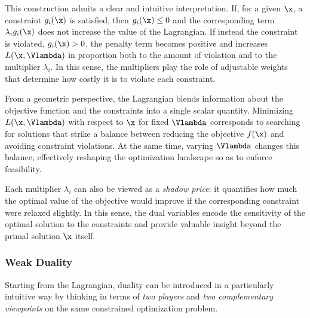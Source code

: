 This construction admits a clear and intuitive interpretation. If, for a given $\x$, a constraint $g_i(\x)$ is satisfied, then $g_i(\x) \le 0$ and the corresponding term $\lambda_i g_i(\x)$ does not increase the value of the Lagrangian. If instead the constraint is violated, $g_i(\x) > 0$, the penalty term becomes positive and increases $L(\x,\Vlambda)$ in proportion both to the amount of violation and to the multiplier $\lambda_i$. In this sense, the multipliers play the role of adjustable weights that determine how costly it is to violate each constraint.

From a geometric perspective, the Lagrangian blends information about the objective function and the constraints into a single scalar quantity. Minimizing $L(\x,\Vlambda)$ with respect to $\x$ for fixed $\Vlambda$ corresponds to searching for solutions that strike a balance between reducing the objective $f(\x)$ and avoiding constraint violations. At the same time, varying $\Vlambda$ changes this balance, effectively reshaping the optimization landscape so as to enforce feasibility.

Each multiplier $\lambda_i$ can also be viewed as a \emph{shadow price}: it quantifies how much the optimal value of the objective would improve if the corresponding constraint were relaxed slightly. In this sense, the dual variables encode the sensitivity of the optimal solution to the constraints and provide valuable insight beyond the primal solution $\x$ itself.
\medskip

\subsubsection*{Weak Duality}

Starting from the Lagrangian, duality can be introduced in a particularly intuitive way by thinking in terms of \emph{two players} and \emph{two complementary viewpoints} on the same constrained optimization problem.

\medskip

